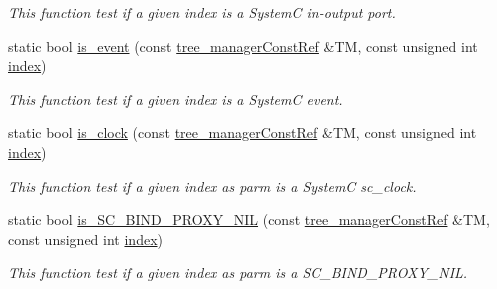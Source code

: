 \begin{Indent}
\begin{DoxyCompactItemize}
\begin{DoxyCompactList}\small\item\em This function test if a given index is a SystemC in-\/output port. \end{DoxyCompactList}\item 
static bool \hyperlink{classtree__helper_a0519f8236f1ff74d770b5d238d7c6c98}{is\+\_\+event} (const \hyperlink{tree__manager_8hpp_a792e3f1f892d7d997a8d8a4a12e39346}{tree\+\_\+manager\+Const\+Ref} \&TM, const unsigned int \hyperlink{tutorial__pact__2019_2Introduction_2third_2include_2Keccak_8h_a028c9bdc8344cca38ab522a337074797}{index})
\begin{DoxyCompactList}\small\item\em This function test if a given index is a SystemC event. \end{DoxyCompactList}\item 
static bool \hyperlink{classtree__helper_aa499e91ca23843d84379d18832867ea6}{is\+\_\+clock} (const \hyperlink{tree__manager_8hpp_a792e3f1f892d7d997a8d8a4a12e39346}{tree\+\_\+manager\+Const\+Ref} \&TM, const unsigned int \hyperlink{tutorial__pact__2019_2Introduction_2third_2include_2Keccak_8h_a028c9bdc8344cca38ab522a337074797}{index})
\begin{DoxyCompactList}\small\item\em This function test if a given index as parm is a SystemC sc\+\_\+clock. \end{DoxyCompactList}\item 
static bool \hyperlink{classtree__helper_a02343f3992681c9b6f614f1d8c3c4c2d}{is\+\_\+\+S\+C\+\_\+\+B\+I\+N\+D\+\_\+\+P\+R\+O\+X\+Y\+\_\+\+N\+IL} (const \hyperlink{tree__manager_8hpp_a792e3f1f892d7d997a8d8a4a12e39346}{tree\+\_\+manager\+Const\+Ref} \&TM, const unsigned int \hyperlink{tutorial__pact__2019_2Introduction_2third_2include_2Keccak_8h_a028c9bdc8344cca38ab522a337074797}{index})
\begin{DoxyCompactList}\small\item\em This function test if a given index as parm is a S\+C\+\_\+\+B\+I\+N\+D\+\_\+\+P\+R\+O\+X\+Y\+\_\+\+N\+IL. \end{DoxyCompactList}\end{DoxyCompactItemize}
\end{Indent}

